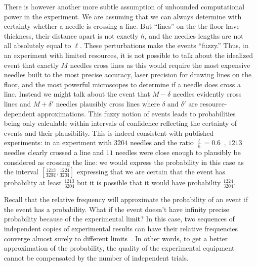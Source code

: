 \documentclass{article}
\theoremstyle{remark}
\begin{document}
There is however another more subtle assumption of unbounded
computational power in the experiment. We are assuming that we can
always determine with certainty whether a needle is crossing a
line. But ``lines'' on the the floor have thickness, their distance
apart is not exactly $h$, and the needles lengths 
are not all absolutely equal to $\ell$. These perturbations make
the events ``fuzzy.'' Thus, in an experiment with limited resources,
it is not possible to talk about the idealized event that exactly $M$
needles cross lines as this would require the most expensive needles
built to the most precise accuracy, laser precision for drawing lines
on the floor, and the most powerful microscopes to determine if a
needle does cross a line. Instead we might talk about the event that
$M-\delta$ needles evidently cross lines and $M+\delta'$ needles
plausibly cross lines where $\delta$ and $\delta'$ are
resource-dependent approximations. This fuzzy notion of events leads
to probabilities being only calculable within intervals of confidence
reflecting the certainty of events and their plausibility. This is
indeed consistent with published experiments: in an experiment with
$3204$ needles and the ratio $\frac{\ell}{h}=0.6$~\cite{DeMorgan1872},
$1213$ needles clearly crossed a line and $11$ needles were close
enough to plausibly be considered as crossing the line: we would
express the probability in this case as the interval
$\left[\frac{1213}{3204},\frac{1224}{3204}\right]$ expressing that we
are certain that the event has probability at least
$\frac{1213}{3204}$ but it is possible that it would have probability
$\frac{1224}{3204}$.

Recall that the relative frequency will approximate the probability
of an event if the event has a probability. What if the event doesn't
have infinity precise probability because of the experimental limit?
In this case, two sequences of independent copies of experimental
results can have their relative frequencies converge almost surely
to different limits~\cite{Marinacci1999,Teran2014}. In other words,
to get a better approximation of the probability, the quality of the
experimental equipment cannot be compensated by the number of independent
trials.

 
\end{document}

